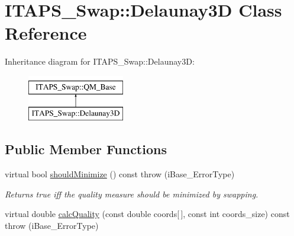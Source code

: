 \hypertarget{class_i_t_a_p_s___swap_1_1_delaunay3_d}{
\section{ITAPS\_\-Swap::Delaunay3D Class Reference}
\label{class_i_t_a_p_s___swap_1_1_delaunay3_d}
}
Inheritance diagram for ITAPS\_\-Swap::Delaunay3D:\begin{figure}[H]
\begin{center}
\leavevmode
\includegraphics[height=2cm]{class_i_t_a_p_s___swap_1_1_delaunay3_d}
\end{center}
\end{figure}
\subsection*{Public Member Functions}
\begin{DoxyCompactItemize}
\item 
\hypertarget{class_i_t_a_p_s___swap_1_1_delaunay3_d_aa1017e73711b3cd8f3a04d64572eff43}{
virtual bool \hyperlink{class_i_t_a_p_s___swap_1_1_delaunay3_d_aa1017e73711b3cd8f3a04d64572eff43}{shouldMinimize} () const   throw (iBase\_\-ErrorType)}
\label{class_i_t_a_p_s___swap_1_1_delaunay3_d_aa1017e73711b3cd8f3a04d64572eff43}

\begin{DoxyCompactList}\small\item\em Returns true iff the quality measure should be minimized by swapping. \item\end{DoxyCompactList}\item 
virtual double \hyperlink{class_i_t_a_p_s___swap_1_1_delaunay3_d_a5d045c523425ea05cdc4df77a4df61ce}{calcQuality} (const double coords\mbox{[}$\,$\mbox{]}, const int coords\_\-size) const   throw (iBase\_\-ErrorType)
\end{DoxyCompactItemize}



